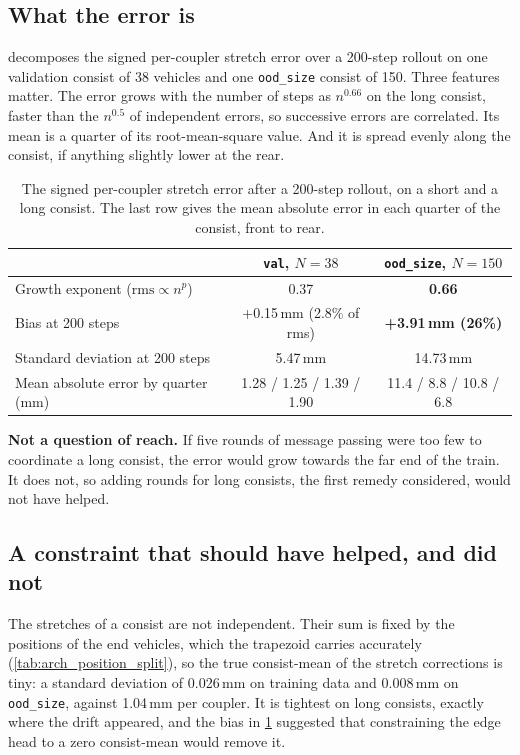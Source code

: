 \subsection{What the error is}

 decomposes the signed per-coupler stretch error over a 200-step rollout on one validation consist of 38 vehicles and one \texttt{ood\_size} consist of 150. Three features matter. The error grows with the number of steps as $n^{0.66}$ on the long consist, faster than the $n^{0.5}$ of independent errors, so successive errors are correlated. Its mean is a quarter of its root-mean-square value. And it is spread evenly along the consist, if anything slightly lower at the rear.

\begin{table}[htbp]
    \centering
    \small
    \begin{tabular}{lcc}
        \toprule
         & \texttt{val}, $N = 38$ & \texttt{ood\_size}, $N = 150$ \\
        \midrule
        Growth exponent ($\text{rms} \propto n^{p}$) & 0.37 & \textbf{0.66} \\
        Bias at 200 steps & +0.15\,mm (2.8\% of rms) & \textbf{+3.91\,mm (26\%)} \\
        Standard deviation at 200 steps & 5.47\,mm & 14.73\,mm \\
        Mean absolute error by quarter (mm) & 1.28 / 1.25 / 1.39 / 1.90 & 11.4 / 8.8 / 10.8 / 6.8 \\
        \bottomrule
    \end{tabular}
    \caption{The signed per-coupler stretch error after a 200-step rollout, on a short and a long consist. The last row gives the mean absolute error in each quarter of the consist, front to rear.}
    \label{tab:train_shape_profile}
\end{table}

\textbf{Not a question of reach.} If five rounds of message passing were too few to coordinate a long consist, the error would grow towards the far end of the train. It does not, so adding rounds for long consists, the first remedy considered, would not have helped.

\subsection{A constraint that should have helped, and did not}

The stretches of a consist are not independent. Their sum is fixed by the positions of the end vehicles, which the trapezoid carries accurately (\cref{tab:arch_position_split}), so the true consist-mean of the stretch corrections is tiny: a standard deviation of 0.026\,mm on training data and 0.008\,mm on \texttt{ood\_size}, against 1.04\,mm per coupler. It is tightest on long consists, exactly where the drift appeared, and the bias in \cref{tab:train_shape_profile} suggested that constraining the edge head to a zero consist-mean would remove it.

